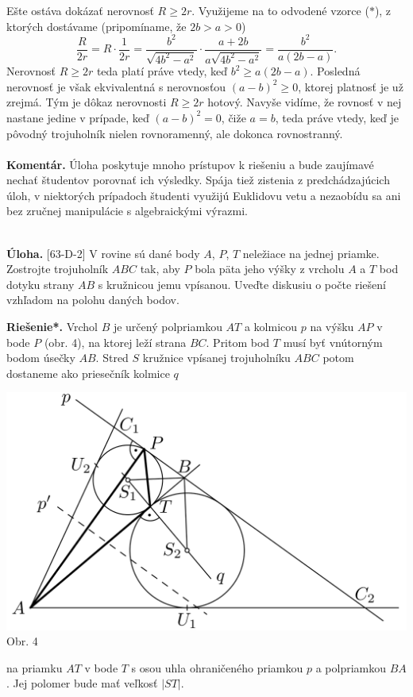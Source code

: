 \documentclass[11pt,a4paper,oneside,final]{book}
\newcommand{\kom}{\textbf{Komentár.} }
\newcommand{\ul}{\textbf{Úloha.} }
\newcommand{\rieh}{\textbf{Riešenie*.} }
\begin{document}
Ešte ostáva dokázať nerovnosť $R \geq 2r$. Využijeme na to odvodené vzorce ($\ast$), z ktorých dostávame (pripomíname, že $2b > a > 0$)
$$ \frac{R}{2r}= R \cdot \frac{1}{2r}=\frac{b^2}{\sqrt{4b^2-a^2}}\cdot \frac{a+2b}{a \sqrt{4b^2-a^2}}=\frac{b^2}{a(2b-a)}.$$
Nerovnosť $R \geq 2r$ teda platí práve vtedy, keď $b^2\geq a(2b -a)$. Posledná nerovnosť je však ekvivalentná s nerovnosťou $(a - b)^2\geq 0$, ktorej platnosť je už zrejmá. Tým je dôkaz nerovnosti $R \geq 2r$ hotový. Navyše vidíme, že rovnosť v nej nastane jedine v prípade, keď $(a - b)^2 = 0$, čiže $a = b$, teda práve vtedy, keď je pôvodný trojuholník nielen rovnoramenný, ale dokonca rovnostranný.\\
\\
\kom Úloha poskytuje mnoho prístupov k riešeniu a bude zaujímavé nechať študentov porovnať ich výsledky. Spája tiež zistenia z predchádzajúcich úloh, v niektorých prípadoch študenti využijú Euklidovu vetu a nezaobídu sa ani bez zručnej manipulácie s algebraickými výrazmi. \\
\\
\begin{tcolorbox}[breakable,notitle,boxrule=0pt,colback=light-gray,colframe=light-gray]\ul [63-D-2]  V rovine sú dané body $A$, $P$, $T$ neležiace na jednej priamke. Zostrojte trojuholník $ABC$ tak, aby $P$ bola päta jeho výšky z vrcholu $A$ a $T$ bod dotyku strany $AB$ s kružnicou jemu vpísanou. Uveďte diskusiu o počte riešení vzhľadom na polohu daných bodov.

\end{tcolorbox}

\rieh Vrchol $B$ je určený polpriamkou $AT$ a kolmicou $p$ na výšku $AP$ v bode $P$ (obr. 4), na ktorej leží strana $BC$. Pritom bod $T$ musí byť vnútorným bodom úsečky $AB$. Stred $S$ kružnice vpísanej trojuholníku $ABC$ potom dostaneme ako priesečník kolmice $q$
\begin{center}
\includegraphics{63D2}\\

Obr. 4
\end{center}
na priamku $AT$ v bode $T$ s osou uhla ohraničeného priamkou $p$ a polpriamkou $BA$. Jej polomer bude mať veľkosť $|ST|$.
\end{document}
